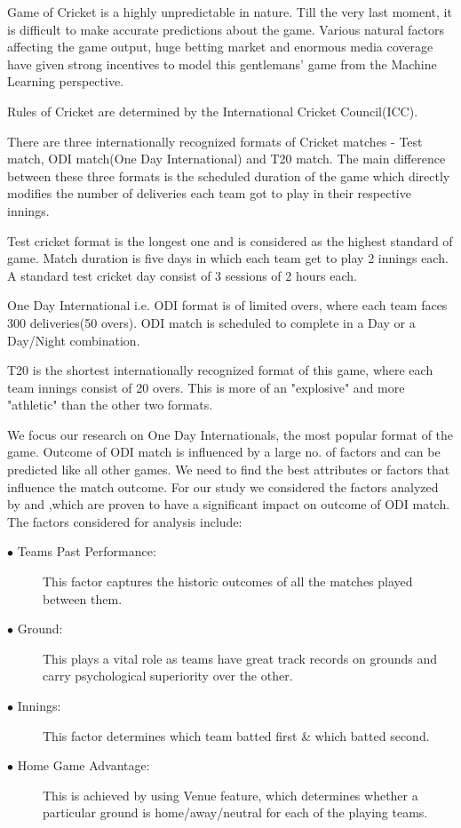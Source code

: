 \documentclass[a4paper, 10pt, conference]{IEEEtran}
\begin{document}
Game of Cricket is a highly unpredictable in nature. Till the very last moment, it is difficult to make accurate predictions about the game. Various natural factors affecting the game output, huge betting market and enormous media coverage have given strong incentives to model this gentlemans' game from the Machine Learning perspective.

Rules of Cricket are determined by the International Cricket Council(ICC).

There are three internationally recognized formats of Cricket matches - Test match, ODI match(One Day International) and T20 match. The main difference between these three formats is the scheduled duration of the game which directly modifies the number of deliveries each team got to play in their respective innings.

Test cricket format is the longest one and is considered as the highest standard of game. Match duration is five days in which each team get to play 2 innings each. A standard test cricket day consist of 3 sessions of 2 hours each.

One Day International i.e. ODI format is of limited overs, where each team faces 300 deliveries(50 overs). ODI match is scheduled to complete in a Day or a Day/Night combination.

T20 is the shortest internationally recognized format of this game, where each team innings consist of 20 overs. This is more of an "explosive" and more "athletic" than the other two formats.

We focus our research on One Day Internationals, the most popular format of the game. Outcome of ODI match is influenced by a large no. of factors and  can be predicted like all other games. We need to find the best attributes or factors that influence the match outcome. For our study we considered the factors analyzed by  and ,which are proven to have a significant impact on outcome of ODI match. The factors considered for analysis include:

\begin{description}
  \item[$\bullet$ Teams Past Performance:] This factor captures the historic outcomes of all the matches played between them.
  \item[$\bullet$ Ground:] This plays a vital role as teams have great track records on grounds and carry psychological superiority over the other.
  \item[$\bullet$ Innings:] This factor determines which team batted first \& which batted second.
  \item[$\bullet$ Home Game Advantage:] This is achieved by using Venue feature, which determines whether a particular ground is home/away/neutral for each of the playing teams.
\end{description}
\end{document}
